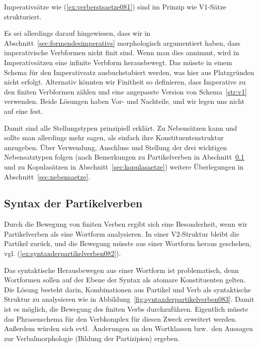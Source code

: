 Imperativsätze wie (\ref{ex:verberstsaetze081}) sind im Prinzip wie V1-Sätze strukturiert.

\begin{exe}
\end{exe}

Es sei allerdings darauf hingewiesen, dass wir in Abschnitt~\ref{sec:formendesimperativs} morphologisch argumentiert haben, dass imperativische Verbformen nicht finit sind.
Wenn man dies annimmt, wird in Imperativsätzen eine infinite Verbform herausbewegt.
Das müsste in einem Schema für den Imperativsatz ausbuchstabiert werden, was hier aus Platzgründen nicht erfolgt.
Alternativ könnten wir Finitheit so definieren, dass Imperative zu den finiten Verbformen zählen und eine angepasste Version von Schema~\ref{str:v1} verwenden.
Beide Lösungen haben Vor- und Nachteile, und wir legen uns nicht auf eine fest.


Damit sind alle Stellungstypen prinzipiell erklärt.
Zu Nebensätzen kann und sollte man allerdings mehr sagen, als einfach ihre Konstituentenstruktur anzugeben.
Über Verwendung, Anschluss und Stellung der drei wichtigen Nebensatztypen folgen (nach Bemerkungen zu Partikelverben in Abschnitt~\ref{sec:syntaxderpartikelverben} und zu Kopulasätzen in Abschnitt~\ref{sec:kopulasaetze}) weitere Überlegungen in Abschnitt~\ref{sec:nebensaetze}.

\subsection{Syntax der Partikelverben}
\label{sec:syntaxderpartikelverben}

Durch die Bewegung von finiten Verben ergibt sich eine Besonderheit, wenn wir Partikelverben als eine Wortform analysieren.
In einer V2-Struktur bleibt die Partikel zurück, und die Bewegung müsste aus einer Wortform heraus geschehen, vgl. (\ref{ex:syntaxderpartikelverben082}).

\begin{exe}
\end{exe}


Das syntaktische Herausbewegen aus einer Wortform ist problematisch, denn Wortformen sollen auf der Ebene der Syntax als atomare Konstituenten gelten.
Die Lösung besteht darin, Kombinationen aus Partikel und Verb als syntaktische Struktur zu analysieren wie in Abbildung~\ref{fig:syntaxderpartikelverben083}.
Damit ist es möglich, die Bewegung des finiten Verbs durchzuführen.
Eigentlich müsste das Phrasenschema für den Verbkomplex für diesen Zweck erweitert werden.
Außerdem würden sich evtl.\ Änderungen an den Wortklassen bzw.\ den Aussagen zur Verbalmorphologie (\zB Bildung der Partizipien) ergeben.

